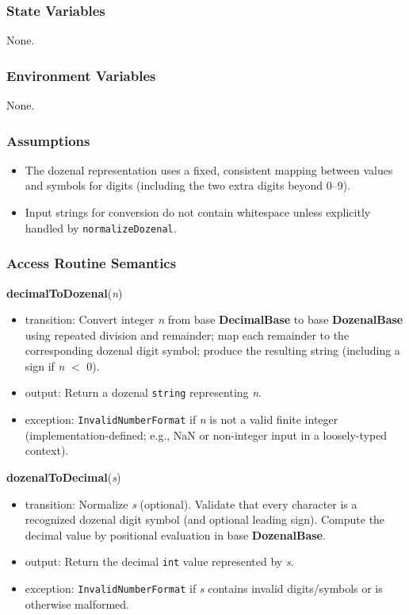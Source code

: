 \documentclass[12pt, titlepage]{article}
\begin{document}
\subsubsection{State Variables}
None.

\subsubsection{Environment Variables}
None.

\subsubsection{Assumptions}
\begin{itemize}
    \item The dozenal representation uses a fixed, consistent mapping between values and symbols for digits (including the two extra digits beyond 0--9).
    \item Input strings for conversion do not contain whitespace unless explicitly handled by \texttt{normalizeDozenal}.
\end{itemize}

\subsubsection{Access Routine Semantics}

\noindent\textbf{decimalToDozenal}(\textit{n})
\begin{itemize}
    \item transition: Convert integer \textit{n} from base \textbf{DecimalBase} to base \textbf{DozenalBase} using repeated division and remainder; map each remainder to the corresponding dozenal digit symbol; produce the resulting string (including a sign if \textit{n} $<$ 0).
    \item output: Return a dozenal \texttt{string} representing \textit{n}.
    \item exception: \texttt{InvalidNumberFormat} if \textit{n} is not a valid finite integer (implementation-defined; e.g., NaN or non-integer input in a loosely-typed context).
\end{itemize}

\noindent\textbf{dozenalToDecimal}(\textit{s})
\begin{itemize}
    \item transition: Normalize \textit{s} (optional). Validate that every character is a recognized dozenal digit symbol (and optional leading sign). Compute the decimal value by positional evaluation in base \textbf{DozenalBase}.
    \item output: Return the decimal \texttt{int} value represented by \textit{s}.
    \item exception: \texttt{InvalidNumberFormat} if \textit{s} contains invalid digits/symbols or is otherwise malformed.
\end{itemize}
\end{document}
